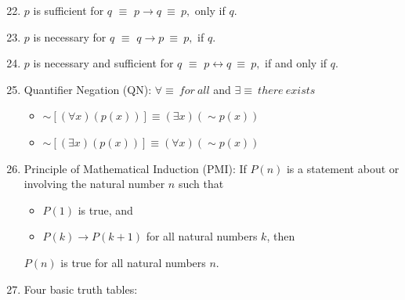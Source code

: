 \noindent
\begin{enumerate}
\setcounter{enumi}{21}
	\item $p$ is sufficient for $q$ $\equiv$ $p\rightarrow q\ \equiv\ p,$ only if $q$.
	\item $p$ is necessary for $q$ $\equiv$ $q\rightarrow p\ \equiv\ p,$ if $q$.
	\item $p$ is necessary and sufficient for $q$ $\equiv$ $p\leftrightarrow q\ \equiv\ p,$ if and only if $q$.
	\item Quantifier Negation (QN): \(\forall\equiv\ for\ all\) and \(\exists\equiv\ there\ exists\)
\begin{itemize}
	\item[(a)] $\sim \left[\left(\forall x\right)\left(p(x)\right)\right]\equiv\left(\exists x\right)\left(\sim p(x)\right)$
	\item[(b)] $\sim \left[\left(\exists x\right)\left(p(x)\right)\right]\equiv\left(\forall x\right)\left(\sim p(x)\right)$
\end{itemize}
	\item Principle of Mathematical Induction (PMI): If $P(n)$ is a statement about or involving the natural number $n$ such that
\begin{itemize}
	\item[(1)] $P(1)$ is true, and
	\item[(2)] $P(k)\rightarrow P(k+1)$ for all natural numbers $k$, then
\end{itemize}
$P(n)$ is true for all natural numbers $n$.

\clearpage

\noindent
	\item Four basic truth tables:


\end{enumerate}
